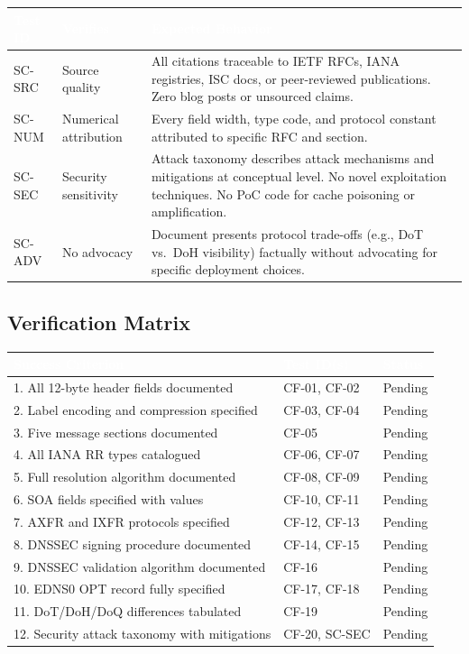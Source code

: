 \documentclass[11pt,letterpaper]{article}
\newcommand{\tableheader}[1]{\textbf{\sffamily\textcolor{white}{#1}}}
\begin{document}
\begin{center}
\begin{tabularx}{\textwidth}{C{1.2cm}L{3.5cm}X}
\toprule
{}
\tableheader{Test ID} & \tableheader{Verifies} & \tableheader{Expected Behavior} \\
\midrule
SC-SRC & Source quality & All citations traceable to IETF RFCs, IANA registries, ISC docs, or peer-reviewed publications. Zero blog posts or unsourced claims. \\
SC-NUM & Numerical attribution & Every field width, type code, and protocol constant attributed to specific RFC and section. \\
SC-SEC & Security sensitivity & Attack taxonomy describes attack mechanisms and mitigations at conceptual level. No novel exploitation techniques. No PoC code for cache poisoning or amplification. \\
SC-ADV & No advocacy & Document presents protocol trade-offs (e.g., DoT vs.\ DoH visibility) factually without advocating for specific deployment choices. \\
\bottomrule
\end{tabularx}
\end{center}

\subsection{Verification Matrix}

\begin{center}
\begin{tabularx}{\textwidth}{XL{4cm}C{1.8cm}}
\toprule
{}
\tableheader{Success Criterion} & \tableheader{Test ID(s)} & \tableheader{Status} \\
. All 12-byte header fields documented & CF-01, CF-02 & Pending \\
2. Label encoding and compression specified & CF-03, CF-04 & Pending \\
3. Five message sections documented & CF-05 & Pending \\
4. All IANA RR types catalogued & CF-06, CF-07 & Pending \\
5. Full resolution algorithm documented & CF-08, CF-09 & Pending \\
6. SOA fields specified with values & CF-10, CF-11 & Pending \\
7. AXFR and IXFR protocols specified & CF-12, CF-13 & Pending \\
8. DNSSEC signing procedure documented & CF-14, CF-15 & Pending \\
9. DNSSEC validation algorithm documented & CF-16 & Pending \\
10. EDNS0 OPT record fully specified & CF-17, CF-18 & Pending \\
11. DoT/DoH/DoQ differences tabulated & CF-19 & Pending \\
12. Security attack taxonomy with mitigations & CF-20, SC-SEC & Pending \\
\bottomrule
\end{tabularx}
\end{center}
\end{document}
